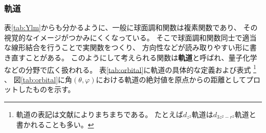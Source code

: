 \documentclass[../main/main]{subfiles}
\begin{document}
\subsubsection{軌道}
表\ref{tab:Ylm}からも分かるように、一般に球面調和関数は複素関数であり、
その視覚的なイメージがつかみにくくなっている。
そこで球面調和関数同士で適当な線形結合を行うことで実関数をつくり、
方向性などが読み取りやすい形に書き直すことがある。
このようにして考えられる関数は\textbf{軌道}と呼ばれ、量子化学などの分野で広く扱われる。
表\ref{tab:orbital}に軌道の具体的な定義および表式
\footnote{
軌道の表記は文献によりまちまちである。
たとえば$d_{z^2}$軌道は$d_{3z^2-r^2}$軌道と書かれることも多い。
}
、
図\ref{tab:orbital}に角$(\theta, \varphi)$における軌道の絶対値を原点からの距離としてプロットしたものを示す。

\end{document}
